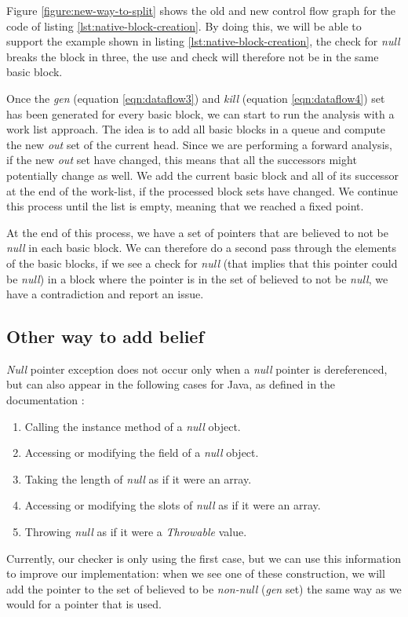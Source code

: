 Figure \ref{figure:new-way-to-split} shows the old and new control flow graph for the code of listing \ref{lst:native-block-creation}. 
By doing this, we will be able to support the example shown in listing \ref{lst:native-block-creation}, the check for \emph{null} breaks the block in three, the use and check will therefore not be in the same basic block.

Once the \emph{gen} (equation \ref{eqn:dataflow3}) and \emph{kill} (equation \ref{eqn:dataflow4}) set has been generated for every basic block, we can start to run the analysis with a work list approach.
The idea is to add all basic blocks in a queue and compute the new \emph{out} set of the current head. 
Since we are performing a forward analysis, if the new \emph{out} set have changed, this means that all the successors might potentially change as well. 
We add the current basic block and all of its successor at the end of the work-list, if the processed block sets have changed. 
We continue this process until the list is empty, meaning that we reached a fixed point.

At the end of this process, we have a set of pointers that are believed to not be \emph{null} in each basic block.
We can therefore do a second pass through the elements of the basic blocks, if we see a check for \emph{null} (that implies that this pointer could be \emph{null}) in a block where the pointer is in the set of believed to not be \emph{null}, we have a contradiction and report an issue.

\subsection{Other way to add belief}
\label{subsec:other_way_to_add_belief}

\emph{Null} pointer exception does not occur only when a \emph{null} pointer is dereferenced, but can also appear in the following cases for Java, as defined in the documentation \cite{OracleDoc:2019:Online}:

\begin{enumerate}
	\item Calling the instance method of a \emph{null} object. \newline 
	\item Accessing or modifying the field of a \emph{null} object. \newline 
	\item Taking the length of \emph{null} as if it were an array. \newline 
	\item Accessing or modifying the slots of \emph{null} as if it were an array. \newline 
	\item Throwing \emph{null} as if it were a \emph{Throwable} value. \newline 
\end{enumerate}
Currently, our checker is only using the first case, but we can use this information to improve our implementation: when we see one of these construction, we will add the pointer to the set of believed to be \emph{non-null} (\emph{gen} set) the same way as we would for a pointer that is used.


